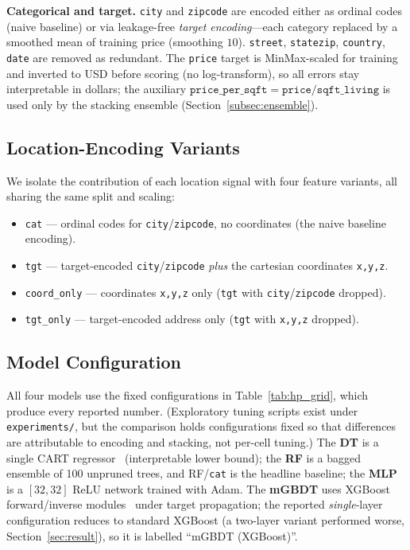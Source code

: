 \textbf{Categorical and target.}
\texttt{city} and \texttt{zipcode} are encoded either as ordinal codes (naive
baseline) or via leakage-free \emph{target encoding}---each category replaced by
a smoothed mean of training price (smoothing $10$). \texttt{street},
\texttt{statezip}, \texttt{country}, \texttt{date} are removed as redundant. The
\texttt{price} target is MinMax-scaled for training and inverted to USD before
scoring (no log-transform), so all errors stay interpretable in dollars; the
auxiliary $\texttt{price\_per\_sqft}=\texttt{price}/\texttt{sqft\_living}$ is used
only by the stacking ensemble (Section~\ref{subsec:ensemble}).

\subsection{Location-Encoding Variants}
\label{subsec:variants}

We isolate the contribution of each location signal with four feature variants,
all sharing the same split and scaling:
\begin{itemize}
  \item \texttt{cat} --- ordinal codes for \texttt{city}/\texttt{zipcode}, no
    coordinates (the naive baseline encoding).
  \item \texttt{tgt} --- target-encoded \texttt{city}/\texttt{zipcode} \emph{plus}
    the cartesian coordinates \texttt{x,y,z}.
  \item \texttt{coord\_only} --- coordinates \texttt{x,y,z} only
    (\texttt{tgt} with \texttt{city}/\texttt{zipcode} dropped).
  \item \texttt{tgt\_only} --- target-encoded address only
    (\texttt{tgt} with \texttt{x,y,z} dropped).
\end{itemize}

\subsection{Model Configuration}

All four models use the fixed configurations in Table~\ref{tab:hp_grid}, which
produce every reported number. (Exploratory tuning scripts exist under
\texttt{experiments/}, but the comparison holds configurations fixed so that
differences are attributable to encoding and stacking, not per-cell tuning.)
The \textbf{DT} is a single CART regressor~\cite{breiman1984cart}
(interpretable lower bound); the \textbf{RF} is a bagged ensemble of 100 unpruned
trees, and RF/\texttt{cat} is the headline baseline; the \textbf{MLP} is a
$[32,32]$ ReLU network trained with Adam. The \textbf{mGBDT} uses XGBoost
forward/inverse modules~\cite{chen2016xgboost} under target propagation; the
reported \emph{single}-layer configuration reduces to standard XGBoost (a
two-layer variant performed worse, Section~\ref{sec:result}), so it is labelled
``mGBDT (XGBoost)''.

